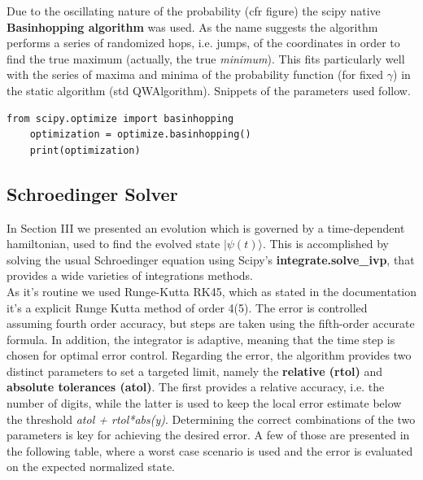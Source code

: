 \documentclass[aps,pra,reprint, onecolumn]{revtex4-2}
\begin{document}
Due to the oscillating nature of the probability (cfr figure) the scipy native \textbf{Basinhopping algorithm} was used. As the name suggests the algorithm performs a series of randomized hops, i.e. jumps, of the coordinates in order to find the true maximum (actually, the true \textit{minimum}). This fits particularly well with the series of maxima and minima of the probability function (for fixed $\gamma$) in the static algorithm (std QWAlgorithm). Snippets of the parameters used follow.

\begin{lstlisting}[xleftmargin=0cm]
	from scipy.optimize import basinhopping
	optimization = optimize.basinhopping()
	print(optimization)
\end{lstlisting}

\subsection{Schroedinger Solver}
In Section III we presented an evolution which is governed by a time-dependent hamiltonian, used to find the evolved state $|\psi(t)\rangle$. This is accomplished by solving the usual Schroedinger equation using Scipy's \textbf{integrate.solve\_ivp}, that provides a wide varieties of integrations methods. \\

As it's routine we used Runge-Kutta RK45, which as stated in the documentation it's a explicit Runge Kutta method of order 4(5). The error is controlled assuming fourth order accuracy, but steps are taken using the fifth-order accurate formula. In addition, the integrator is adaptive, meaning that the time step is chosen for optimal error control. Regarding the error, the algorithm provides two distinct parameters to set a targeted limit, namely the \textbf{relative (rtol)} and \textbf{absolute tolerances (atol)}. The first provides a relative accuracy, i.e. the number of digits, while the latter is used to keep the local error estimate below the threshold \textit{atol + rtol*abs(y)}. Determining the correct combinations of the two parameters is key for achieving the desired error. A few of those are presented in the following table, where a worst case scenario is used and the error is evaluated on the expected normalized state. \\
\end{document}
